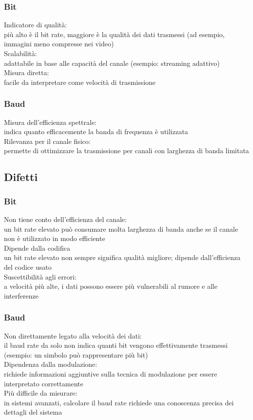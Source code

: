 \documentclass[10pt,oneside,a4paper]{article}
\begin{document}
\subsubsection{Bit}
Indicatore di qualità:\\
più alto è il bit rate, maggiore è la qualità dei dati trasmessi (ad esempio, immagini meno compresse nei video)\\
Scalabilità:\\
adattabile in base alle capacità del canale (esempio: streaming adattivo)\\
Misura diretta:\\
facile da interpretare come velocità di trasmissione
\subsubsection{Baud}
Misura dell'efficienza spettrale:\\
indica quanto efficacemente la banda di frequenza è utilizzata\\
Rilevanza per il canale fisico:\\
permette di ottimizzare la trasmissione per canali con larghezza di banda limitata
\subsection{Difetti}
\subsubsection{Bit}
Non tiene conto dell'efficienza del canale:\\
un bit rate elevato può consumare molta larghezza di banda anche se il canale non è utilizzato in modo efficiente\\
Dipende dalla codifica\\
un bit rate elevato non sempre significa qualità migliore; dipende dall'efficienza del codice usato\\
Suscettibilità agli errori:\\
a velocità più alte, i dati possono essere più vulnerabili al rumore e alle interferenze\\
\subsubsection{Baud}
Non direttamente legato alla velocità dei dati:\\
il baud rate da solo non indica quanti bit vengono effettivamente trasmessi (esempio: un simbolo può rappresentare più bit)\\
Dipendenza dalla modulazione:\\
richiede informazioni aggiuntive sulla tecnica di modulazione per essere interpretato correttamente\\
Più difficile da misurare:\\
in sistemi avanzati, calcolare il baud rate richiede una conoscenza precisa dei dettagli del sistema
\end{document}
